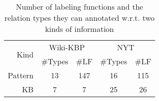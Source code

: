

\begin{table}[t]
\centering
\begin{footnotesize}
\begin{tabular}{r||c|c||c|c}
\hline
\multirow{2}{*}{Kind}& \multicolumn{2}{c||}{Wiki-KBP} & \multicolumn{2}{c}{NYT} \\
\cline{2-5}
 & \#Types & \#LF & \#Types & \#LF\\
\hline
Pattern& 13 & 147 & 16 & 115\\
\hline
KB& 7 & 7 & 25 & 26\\
\hline
\end{tabular}
\end{footnotesize}
\caption{\small Number of labeling functions and the relation types they can annotated w.r.t. two kinds of information}
\label{tab:lf_stats}
\end{table}



